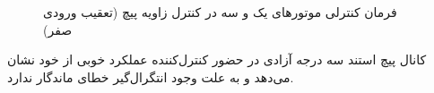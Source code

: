 \documentclass{CCI2020}
\begin{document}

\begin{figure}[H]
	\centering
	
	\caption{فرمان کنترلی موتورهای یک و سه در کنترل زاویه پیچ (تعقیب ورودی صفر)}
\end{figure}
کانال پیچ استند سه درجه آزادی در حضور کنترل‌کننده  عملکرد خوبی از خود نشان می‌دهد و به علت وجود انتگرال‌گیر خطای ماندگار ندارد.
\end{document}
